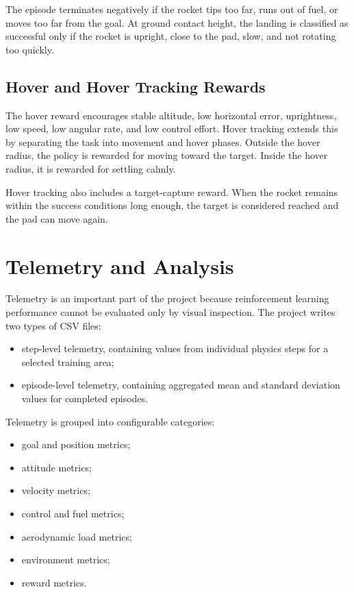 \documentclass[12pt,a4paper]{article}
\begin{document}
The episode terminates negatively if the rocket tips too far, runs out of fuel, or moves too far from the goal. At ground contact height, the landing is classified as successful only if the rocket is upright, close to the pad, slow, and not rotating too quickly.

\subsection{Hover and Hover Tracking Rewards}

The hover reward encourages stable altitude, low horizontal error, uprightness, low speed, low angular rate, and low control effort. Hover tracking extends this by separating the task into movement and hover phases. Outside the hover radius, the policy is rewarded for moving toward the target. Inside the hover radius, it is rewarded for settling calmly.

Hover tracking also includes a target-capture reward. When the rocket remains within the success conditions long enough, the target is considered reached and the pad can move again.

\section{Telemetry and Analysis}

Telemetry is an important part of the project because reinforcement learning performance cannot be evaluated only by visual inspection. The project writes two types of CSV files:

\begin{itemize}
    \item step-level telemetry, containing values from individual physics steps for a selected training area;
    \item episode-level telemetry, containing aggregated mean and standard deviation values for completed episodes.
\end{itemize}

Telemetry is grouped into configurable categories:

\begin{itemize}
    \item goal and position metrics;
    \item attitude metrics;
    \item velocity metrics;
    \item control and fuel metrics;
    \item aerodynamic load metrics;
    \item environment metrics;
    \item reward metrics.
\end{itemize}
\end{document}

